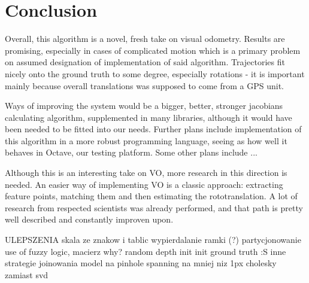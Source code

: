 \chapter{Conclusion}

Overall, this algorithm is a novel, fresh take on visual odometry. Results are promising, especially in cases of complicated motion which is a primary problem on assumed designation of implementation of said algorithm. Trajectories fit nicely onto the ground truth to some degree, especially rotations - it is important mainly because overall translations was supposed to come from a GPS unit.

Ways of improving the system would be a bigger, better, stronger jacobians calculating algorithm, supplemented in many libraries, although it would have been needed to be fitted into our needs. Further plans include implementation of this algorithm in a more robust programming language, seeing as how well it behaves in Octave, our testing platform. Some other plans include ...

Although this is an interesting take on VO, more research in this direction is needed. An easier way of implementing VO is a classic approach: extracting feature points, matching them and then estimating the rototranslation. A lot of research from respected scientists was already performed, and that path is pretty well described and constantly improven upon.


ULEPSZENIA
skala ze znakow i tablic
wypierdalanie ramki (?)
partycjonowanie
use of fuzzy logic, macierz why?
random depth init
init ground truth :S
inne strategie joinowania
model na pinhole
spanning na mniej niz 1px
cholesky zamiast svd



